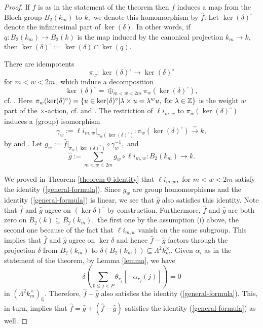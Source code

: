 \documentclass{amsart}
\theoremstyle{definition}
\numberwithin{equation}{subsection}
\newcommand{\isomto}{\overset{\sim}{\rightarrow}}
\begin{document}
\begin{proof}

If $f$ is as in the statement of the theorem  then $f$ induces a map from the Bloch group $B_{2}(k_{m})$ to $k,$ 
we denote this homomorphism by $\hat{f}.$  Let $\ker (\delta)^{\circ}$ denote the infinitesimal part of $\ker (\delta).$ In other words, if $q:B_{2}(k_{m}) \to B_{2}(k)$ is the  map induced by the canonical projection $k_{m} \to k,$ then $\ker (\delta)^{\circ}:=\ker (\delta)\cap \ker(q).$  

There are idempotents 
$$
\pi_{w} : \ker (\delta)^{\circ} \to \ker (\delta) ^{\circ} 
$$
for $m<w<2m,$ which induce a decomposition 
$$
\ker (\delta) ^{\circ} = \oplus_{m<w<2m} \pi _{w} (\ker (\delta)^{\circ}), 
$$  
cf. \cite[.1]{u1}. 
Here $\pi _{w} (\ker (\delta)^{\circ})=\{u \in  \ker (\delta)^{\circ}| \lambda \times u = \lambda ^w u, {\rm \; for \; } \lambda \in \mathbb{Z} \}$   is the weight $w$ part of the $\times$-action, cf.  and \cite[Notation 2.0.1]{u1}. The  restriction of $\ell i _{m,w}$  to $\pi _{w} (\ker (\delta)^{\circ}) $ induces a (group) isomorphism $$ 
\gamma_{w}:=\ell i _{m,w}|_{\pi _{w} (\ker (\delta)^{\circ})}:\pi _{w} (\ker (\delta)^{\circ}) \isomto k,
$$
by \cite[Theorem 1.3.1]{u1} and \cite[Theorem 1.3.2]{u1}. 
Let $g_{w}:= \hat{f}|_{\pi _{w} (\ker (\delta)^{\circ})}\circ\gamma_{w}^{-1},$ and 
\[\hat{g}:=\sum_{m <w <2m} g_{w} \circ \ell i_{m,w}:B_{2}(k_{m}) \to k. \] 

We proved in Theorem \ref{theorem-0-identity} that $\ell i _{m,w},$ for $m<w<2m$ satisfy the  identity (\ref{general-formula}). Since $g_{w}$ are group homomorphisms and the identity (\ref{general-formula}) is linear,  we see that $\hat{g}$ also satisfies this identity. Note that  $\hat{f}$ and $\hat{g}$ agree on $(\ker{\delta})^{\circ}$ by construction.  Furthermore, $\hat{f}$ and $\hat{g}$ are both zero on $B_{2}(k)\subseteq B_{2}(k_m), $ the first one by the assumption (i) above, the second one because of the fact that $\ell i _{m,w}$ vanish on the same subgroup. This implies that  $\hat{f}$ and $\hat{g}$ agree on $\ker{\delta}$ and hence $\hat{f}-\hat{g}$ factors through the projection $\delta$ from $B_{2}(k_{m})$ to $\delta(B_{2}(k_{m})) \subseteq \Lambda ^{2} k_{m} ^{\times}.$ Given $\alpha _{i}$ as in the statement of the theorem, by Lemma \ref{lemma}, we have 
$$
\delta(\sum_{0\leq j<P}\theta_{r_j}[-\alpha_{r_j}(j)])=0
$$ 
in $(\Lambda ^{2}k_{m} ^{\times})_{\mathbb{Q}}.$
Therefore, $\hat{f}-\hat{g}$ also satisfies the identity (\ref{general-formula}). This, in turn, implies that $\hat{f}=\hat{g}+(\hat{f}-\hat{g})$ satisfies the identity  (\ref{general-formula}) as well. 
 
\end{proof}
\end{document}
